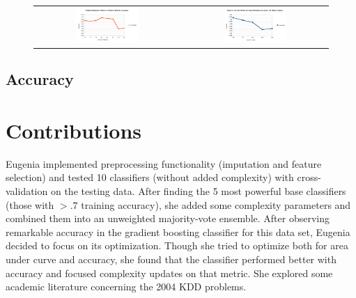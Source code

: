 \documentclass{article}
\begin{document}
\begin{figure}[!h]
\centering
\begin{tabular}{cc}
\includegraphics[width=0.45\textwidth]{nn_features} &
\includegraphics[width=0.45\textwidth]{nn_epochs}
\end{tabular}
\label{nn_figs}
\end{figure}


\subsection{Accuracy}


\section{Contributions}

Eugenia implemented preprocessing functionality (imputation and feature selection) and tested 10 classifiers (without added complexity) with cross-validation on the testing data. 
After finding the 5 most powerful base classifiers (those with $> .7$ training accuracy), she added some complexity parameters and combined them into an unweighted majority-vote ensemble. 
After observing remarkable accuracy in the gradient boosting classifier for this data set, Eugenia decided to focus on its optimization.
Though she tried to optimize both for area under curve and accuracy, she found that the classifier performed better with accuracy and focused complexity updates on that metric.
She explored some academic literature concerning the 2004 KDD problems.
\end{document}
